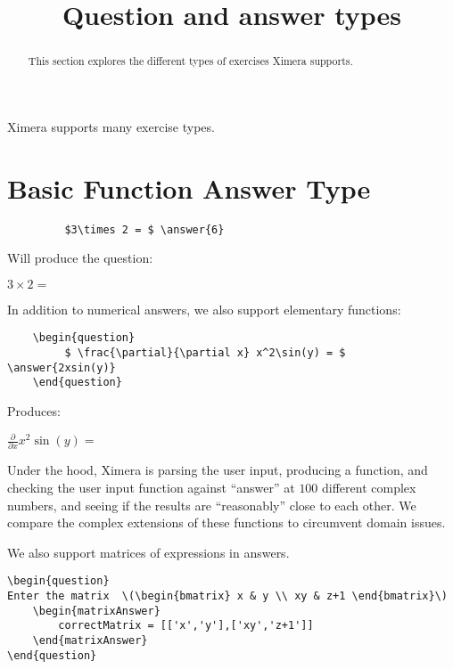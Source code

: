 \documentclass{ximera}
\title{Question and answer types}
\begin{document}
\begin{abstract}
  This section explores the different types of exercises Ximera supports. 
\end{abstract}

\maketitle

Ximera supports many exercise types.


\section{Basic Function Answer Type}

\begin{verbatim}
         $3\times 2 = $ \answer{6}
\end{verbatim}

Will produce the question:

\begin{question}
  $3\times 2 = $ 
\end{question}


In addition to numerical answers, we also support elementary functions:

\begin{verbatim}
    \begin{question}
         $ \frac{\partial}{\partial x} x^2\sin(y) = $ \answer{2xsin(y)}
    \end{question}
\end{verbatim}

Produces:

\begin{question}
  $ \frac{\partial}{\partial x} x^2\sin(y) = $ 
\end{question}

\begin{remark}
Under the hood, Ximera is parsing the user input, producing a
function, and checking the user input function against ``answer'' at
$100$ different complex numbers, and seeing if the results are
``reasonably'' close to each other.  We compare the complex extensions
of these functions to circumvent domain issues.
\end{remark}

We also support matrices of expressions in answers.

\begin{verbatim}
\begin{question}
Enter the matrix  \(\begin{bmatrix} x & y \\ xy & z+1 \end{bmatrix}\)
    \begin{matrixAnswer}
	    correctMatrix = [['x','y'],['xy','z+1']]
    \end{matrixAnswer}
\end{question}
\end{verbatim}
\end{document}

